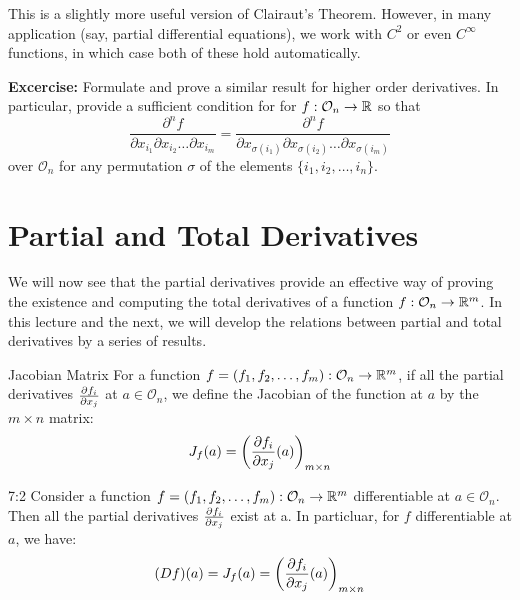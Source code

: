 \documentclass[../Analysis-3.tex]{subfiles}
\begin{document}
This is a slightly more useful version of Clairaut's Theorem. However, in many application (say, partial differential equations), we work with $C^2$ or even $C^\infty$ functions, in which case both of these hold automatically.\\

\vspace{.2 cm}

\textbf{Excercise:} Formulate and prove a similar result for higher order derivatives. In particular, provide a sufficient condition for  for $f: \mathcal{O}_n \to \mathbb{R}$ so that
\[\frac{\partial^n f}{\partial x_{i_1} \partial x_{i_2} \dots \partial x_{i_m}} = \frac{\partial^n f}{\partial x_{\sigma(i_1)} \partial x_{\sigma(i_2)} \dots \partial x_{\sigma(i_m)}}\]
over $\mathcal{O}_n$ for any permutation $\sigma$ of the elements $\{i_1,i_2,\dots,i_n\}$.

\section{Partial and Total Derivatives}

We will now see that the partial derivatives provide an effective way of proving the existence and computing the total derivatives of a function $f: \mathcal{O}_n \to \mathbb{R}^m$. In this lecture and the next, we will develop the relations between partial and total derivatives by a series of results.

\begin{Def}{Jacobian Matrix}{}
  For a function $f = (f_1, f_2, \dots, f_m): \mathcal{O}_n \to \mathbb{R}^m$, if all the partial derivatives $\pdv{f_i}{x_j}$ at $a \in \mathcal{O}_n$, we define the Jacobian of the function at $a$ by the $m \times n$ matrix:
  \[J_f(a) = \left( \pdv{f_i}{x_j}\/(a) \right)_{m \times n}\]
\end{Def}

\begin{Thm}{}{7:2}
  Consider a function $f = (f_1, f_2, \dots, f_m): \mathcal{O}_n \to \mathbb{R}^m$ differentiable at $a \in \mathcal{O}_n$. Then all the partial derivatives $\pdv{f_i}{x_j}$ exist at a. In particluar, for $f$ differentiable at $a$, we have:
  \[(Df)(a) = J_f(a) = \left( \pdv{f_i}{x_j} \/ (a)\right)_{m \times n}\]
\end{Thm}
\end{document}
